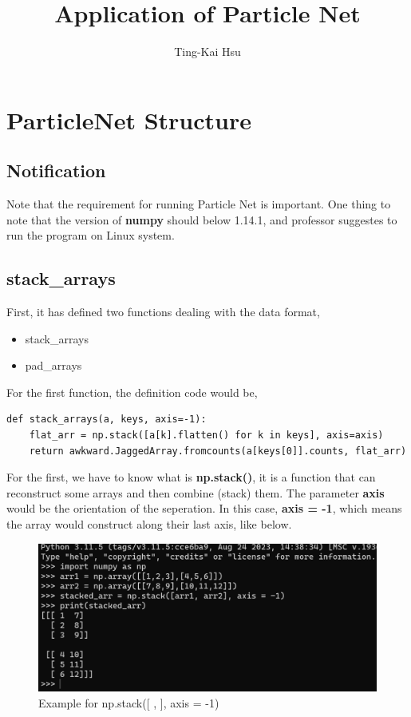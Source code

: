 \documentclass[12pt]{report}
\title{Application of Particle Net}
\author{Ting-Kai Hsu}
\date{}
\numberwithin{equation}{section}
\begin{document}
\maketitle
\tableofcontents

\chapter{ParticleNet Structure}
\section{Notification}
Note that the requirement for running Particle Net is important.
One thing to note that the version of \textbf{numpy} should below 1.14.1, and professor suggestes to run the program on Linux system.

\section{stack\_arrays}
First, it has defined two functions dealing with the data format, 

\begin{itemize}
    \item stack\_arrays
    \item pad\_arrays
\end{itemize}

For the first function, the definition code would be,
\begin{lstlisting}
def stack_arrays(a, keys, axis=-1):
    flat_arr = np.stack([a[k].flatten() for k in keys], axis=axis)
    return awkward.JaggedArray.fromcounts(a[keys[0]].counts, flat_arr)
\end{lstlisting}

For the first, we have to know what is \textbf{np.stack()}, it is a function that can reconstruct some arrays and then combine (stack) them. The parameter \textbf{axis} would be the orientation of the seperation.
In this case, \textbf{axis = -1}, which means the array would construct along their last axis, like below.
\begin{figure}[H]
    \centering
    \includegraphics[width=\linewidth]{np.stack.png}
    \caption{Example for np.stack([ , ], axis = -1)}
    \label{1}
\end{figure}
\end{document}
